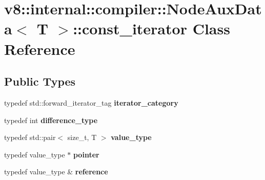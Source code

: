 \hypertarget{classv8_1_1internal_1_1compiler_1_1_node_aux_data_1_1const__iterator}{}\section{v8\+:\+:internal\+:\+:compiler\+:\+:Node\+Aux\+Data$<$ T $>$\+:\+:const\+\_\+iterator Class Reference}
\label{classv8_1_1internal_1_1compiler_1_1_node_aux_data_1_1const__iterator}
\subsection*{Public Types}
\begin{DoxyCompactItemize}
\item 
typedef std\+::forward\+\_\+iterator\+\_\+tag {\bfseries iterator\+\_\+category}\hypertarget{classv8_1_1internal_1_1compiler_1_1_node_aux_data_1_1const__iterator_a378edf2ccde81f5b58a8d8b7838d5d00}{}\label{classv8_1_1internal_1_1compiler_1_1_node_aux_data_1_1const__iterator_a378edf2ccde81f5b58a8d8b7838d5d00}

\item 
typedef int {\bfseries difference\+\_\+type}\hypertarget{classv8_1_1internal_1_1compiler_1_1_node_aux_data_1_1const__iterator_a97761c4ec0a7d09cc01055d5cc286ab8}{}\label{classv8_1_1internal_1_1compiler_1_1_node_aux_data_1_1const__iterator_a97761c4ec0a7d09cc01055d5cc286ab8}

\item 
typedef std\+::pair$<$ size\+\_\+t, T $>$ {\bfseries value\+\_\+type}\hypertarget{classv8_1_1internal_1_1compiler_1_1_node_aux_data_1_1const__iterator_a8a9b87371c32814bb4e61aead1acc64f}{}\label{classv8_1_1internal_1_1compiler_1_1_node_aux_data_1_1const__iterator_a8a9b87371c32814bb4e61aead1acc64f}

\item 
typedef value\+\_\+type $\ast$ {\bfseries pointer}\hypertarget{classv8_1_1internal_1_1compiler_1_1_node_aux_data_1_1const__iterator_a6a4df22fb847be80fe0dc02c00f27b29}{}\label{classv8_1_1internal_1_1compiler_1_1_node_aux_data_1_1const__iterator_a6a4df22fb847be80fe0dc02c00f27b29}

\item 
typedef value\+\_\+type \& {\bfseries reference}\hypertarget{classv8_1_1internal_1_1compiler_1_1_node_aux_data_1_1const__iterator_a6b5de519e57dfa3d62ec4c25f35d635a}{}\label{classv8_1_1internal_1_1compiler_1_1_node_aux_data_1_1const__iterator_a6b5de519e57dfa3d62ec4c25f35d635a}

\end{DoxyCompactItemize}
